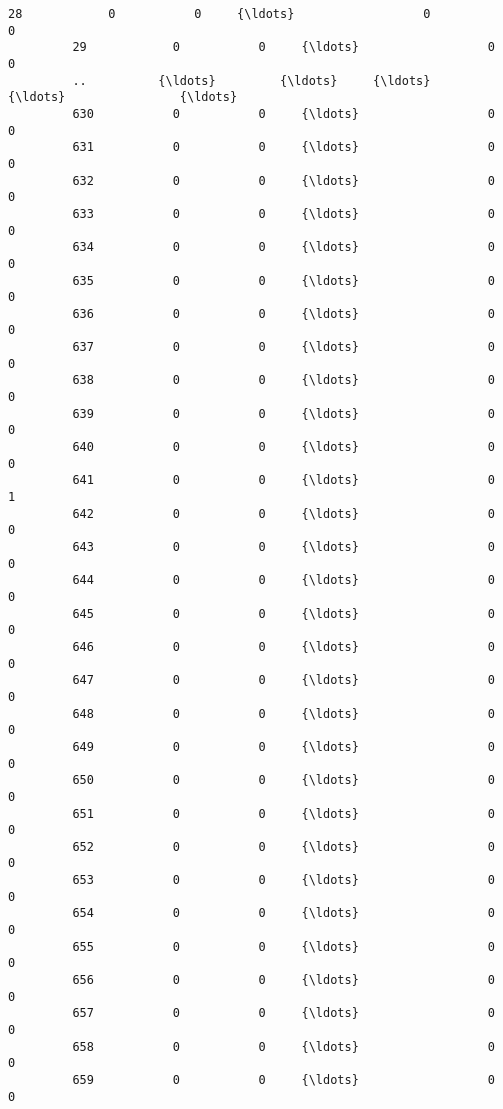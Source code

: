 \documentclass[11pt]{article}
\begin{document}
\begin{Verbatim}[commandchars=\\\{\}]
         28            0           0     {\ldots}                  0                  0   
         29            0           0     {\ldots}                  0                  0   
         ..          {\ldots}         {\ldots}     {\ldots}                {\ldots}                {\ldots}   
         630           0           0     {\ldots}                  0                  0   
         631           0           0     {\ldots}                  0                  0   
         632           0           0     {\ldots}                  0                  0   
         633           0           0     {\ldots}                  0                  0   
         634           0           0     {\ldots}                  0                  0   
         635           0           0     {\ldots}                  0                  0   
         636           0           0     {\ldots}                  0                  0   
         637           0           0     {\ldots}                  0                  0   
         638           0           0     {\ldots}                  0                  0   
         639           0           0     {\ldots}                  0                  0   
         640           0           0     {\ldots}                  0                  0   
         641           0           0     {\ldots}                  0                  1   
         642           0           0     {\ldots}                  0                  0   
         643           0           0     {\ldots}                  0                  0   
         644           0           0     {\ldots}                  0                  0   
         645           0           0     {\ldots}                  0                  0   
         646           0           0     {\ldots}                  0                  0   
         647           0           0     {\ldots}                  0                  0   
         648           0           0     {\ldots}                  0                  0   
         649           0           0     {\ldots}                  0                  0   
         650           0           0     {\ldots}                  0                  0   
         651           0           0     {\ldots}                  0                  0   
         652           0           0     {\ldots}                  0                  0   
         653           0           0     {\ldots}                  0                  0   
         654           0           0     {\ldots}                  0                  0   
         655           0           0     {\ldots}                  0                  0   
         656           0           0     {\ldots}                  0                  0   
         657           0           0     {\ldots}                  0                  0   
         658           0           0     {\ldots}                  0                  0   
         659           0           0     {\ldots}                  0                  0   
         

\end{Verbatim}
\end{document}
